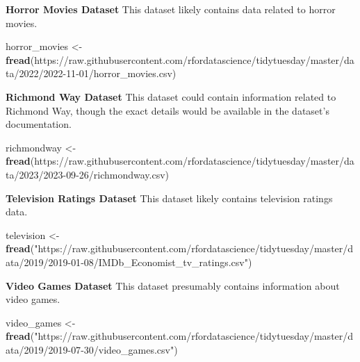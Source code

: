 \documentclass[
]{book}
\newenvironment{Shaded}{\begin{snugshade}}{\end{snugshade}}
\newcommand{\FunctionTok}[1]{\textcolor[rgb]{0.13,0.29,0.53}{\textbf{#1}}}
\newcommand{\NormalTok}[1]{#1}
\newcommand{\OtherTok}[1]{\textcolor[rgb]{0.56,0.35,0.01}{#1}}
\newcommand{\StringTok}[1]{\textcolor[rgb]{0.31,0.60,0.02}{#1}}
\begin{document}
\textbf{Horror Movies Dataset}
This dataset likely contains data related to horror movies.

\begin{Shaded}
\begin{Highlighting}[]
\NormalTok{horror\_movies }\OtherTok{\textless{}{-}} \FunctionTok{fread}\NormalTok{(}\StringTok{\textquotesingle{}https://raw.githubusercontent.com/rfordatascience/tidytuesday/master/data/2022/2022{-}11{-}01/horror\_movies.csv\textquotesingle{}}\NormalTok{)}
\end{Highlighting}
\end{Shaded}

\textbf{Richmond Way Dataset}
This dataset could contain information related to Richmond Way, though the exact details would be available in the dataset's documentation.

\begin{Shaded}
\begin{Highlighting}[]
\NormalTok{richmondway }\OtherTok{\textless{}{-}} \FunctionTok{fread}\NormalTok{(}\StringTok{\textquotesingle{}https://raw.githubusercontent.com/rfordatascience/tidytuesday/master/data/2023/2023{-}09{-}26/richmondway.csv\textquotesingle{}}\NormalTok{)}
\end{Highlighting}
\end{Shaded}

\textbf{Television Ratings Dataset}
This dataset likely contains television ratings data.

\begin{Shaded}
\begin{Highlighting}[]
\NormalTok{television }\OtherTok{\textless{}{-}} \FunctionTok{fread}\NormalTok{(}\StringTok{"https://raw.githubusercontent.com/rfordatascience/tidytuesday/master/data/2019/2019{-}01{-}08/IMDb\_Economist\_tv\_ratings.csv"}\NormalTok{)}
\end{Highlighting}
\end{Shaded}

\textbf{Video Games Dataset}
This dataset presumably contains information about video games.

\begin{Shaded}
\begin{Highlighting}[]
\NormalTok{video\_games }\OtherTok{\textless{}{-}} \FunctionTok{fread}\NormalTok{(}\StringTok{"https://raw.githubusercontent.com/rfordatascience/tidytuesday/master/data/2019/2019{-}07{-}30/video\_games.csv"}\NormalTok{)}
\end{Highlighting}
\end{Shaded}
\end{document}
